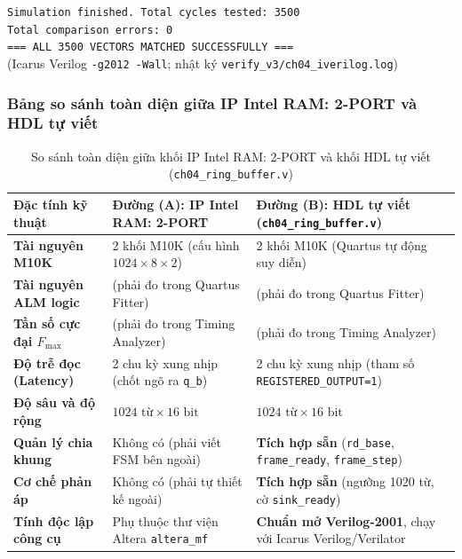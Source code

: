 \begin{center}
\small\texttt{Simulation finished. Total cycles tested: 3500}\\
\small\texttt{Total comparison errors: 0}\\
\small\texttt{=== ALL 3500 VECTORS MATCHED SUCCESSFULLY ===}\\
\footnotesize(Icarus Verilog \texttt{-g2012 -Wall}; nhật ký \texttt{verify\_v3/ch04\_iverilog.log})
\end{center}

\subsubsection*{Bảng so sánh toàn diện giữa IP Intel RAM: 2-PORT và HDL tự viết}

\begin{table}[t]
\centering
\caption{So sánh toàn diện giữa khối IP Intel RAM: 2-PORT và khối HDL tự viết (\texttt{ch04\_ring\_buffer.v})}
\label{tab:ch04_ip_vs_hdl}
\begin{tabularx}{\textwidth}{p{3.2cm}XX}
\toprule
\textbf{Đặc tính kỹ thuật} & \textbf{Đường (A): IP Intel RAM: 2-PORT} & \textbf{Đường (B): HDL tự viết (\texttt{ch04\_ring\_buffer.v})} \\
\midrule
\textbf{Tài nguyên M10K} & 2 khối M10K (cấu hình $1024 \times 8 \times 2$) & 2 khối M10K (Quartus tự động suy diễn) \\
\textbf{Tài nguyên ALM logic} & (phải đo trong Quartus Fitter) & (phải đo trong Quartus Fitter) \\
\textbf{Tần số cực đại $F_{\max}$} & (phải đo trong Timing Analyzer) & (phải đo trong Timing Analyzer) \\
\textbf{Độ trễ đọc (Latency)} & 2 chu kỳ xung nhịp (chốt ngõ ra \texttt{q\_b}) & 2 chu kỳ xung nhịp (tham số \texttt{REGISTERED\_OUTPUT=1}) \\
\textbf{Độ sâu và độ rộng} & $1024\text{ từ} \times 16\text{ bit}$ & $1024\text{ từ} \times 16\text{ bit}$ \\
\textbf{Quản lý chia khung} & Không có (phải viết FSM bên ngoài) & \textbf{Tích hợp sẵn} (\texttt{rd\_base}, \texttt{frame\_ready}, \texttt{frame\_step}) \\
\textbf{Cơ chế phản áp} & Không có (phải tự thiết kế ngoài) & \textbf{Tích hợp sẵn} (ngưỡng 1020 từ, cờ \texttt{sink\_ready}) \\
\textbf{Tính độc lập công cụ} & Phụ thuộc thư viện Altera \texttt{altera\_mf} & \textbf{Chuẩn mở Verilog-2001}, chạy với Icarus Verilog/Verilator \\
\bottomrule
\end{tabularx}
\end{table}

